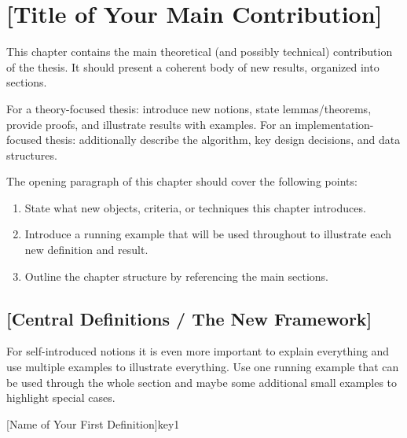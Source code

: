 \chapter{[Title of Your Main Contribution]}\label{chap:main-chapter}

This chapter contains the main theoretical (and possibly technical) contribution
of the thesis.  It should present a coherent body of new results, organized
into sections.

For a theory-focused thesis: introduce new notions, state lemmas/theorems,
provide proofs, and illustrate results with examples.
For an implementation-focused thesis: additionally describe the algorithm,
key design decisions, and data structures.

The opening paragraph of this chapter should cover the following points:
\begin{enumerate}
    \item State what new objects, criteria, or techniques this chapter introduces.
    \item Introduce a running example that will be used throughout to illustrate
          each new definition and result.
    \item Outline the chapter structure by referencing the main sections.
\end{enumerate}

\section{[Central Definitions / The New Framework]}\label{sec:main-definitions}


For self-introduced notions it is even more important to explain everything
and use multiple examples to illustrate everything.
Use one running example that can be used through the whole section 
and maybe some additional small examples to highlight special cases.

\begin{Definition}{[Name of Your First Definition]}{key1}

\end{Definition}

